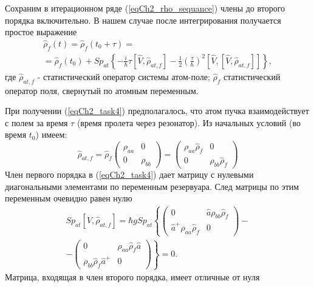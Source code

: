 Сохраним в итерационном ряде (\ref{eqCh2_rho_sequance}) члены до
второго порядка включительно. В нашем случае после интегрирования
получается простое выражение  
\begin{eqnarray}
\hat{\rho}_{f}\left(t\right) =
\hat{\rho}_{f}\left(t_0 + \tau\right) = 
\nonumber \\
= \hat{\rho}_{f}\left(t_0\right) +
Sp_{at}
\left\{
- \frac{i}{\hbar}\tau\left[\hat{V}, \hat{\rho}_{at, f}\right]
- \frac{1}{2} \left(\frac{\tau}{\hbar}\right)^2
\left[\hat{V},\left[\hat{V}, \hat{\rho}_{at, f}
\right]\right]
\right\}, 
\label{eqCh2_task4}
\end{eqnarray}
где $\hat{\rho}_{at, f}$ -  статистический оператор системы атом-поле;
$\hat{\rho}_{f}$ статистический оператор поля, свернутый по
атомным переменным.
  
При получении (\ref{eqCh2_task4}) предполагалось, что атом пучка
взаимодействует с полем за время $\tau$ (время пролета через
резонатор). Из начальных условий (во время $t_0$) имеем:  
\begin{equation}
\hat{\rho}_{at, f} = \hat{\rho}_{f}
\left(
\begin{array} {cc}
\rho_{aa} & 0  
\\
0 & \rho_{bb} 
\end{array}
\right) = 
\left(
\begin{array} {cc}
\rho_{aa}\hat{\rho}_{f} & 0  
\\
0 & \rho_{bb}\hat{\rho}_{f}
\end{array}
\right)
\end{equation}
Член первого порядка в (\ref{eqCh2_task4}) дает матрицу с нулевыми
диагональными элементами по переменным резервуара. След матрицы по
этим переменным очевидно равен нулю  
\begin{eqnarray}
Sp_{at}\left[\hat{V}, \hat{\rho}_{at, f}\right] = 
\hbar g Sp_{at}
\left\{
\left(
\begin{array} {cc}
0 & \hat{a} \rho_{bb}\hat{\rho}_{f}  
\\
\hat{a}^{+} \rho_{aa}\hat{\rho}_{f}   & 0
\end{array}
\right)
\right.
-
\nonumber \\
-
\left.
\left(
\begin{array} {cc}
0 & \rho_{aa} \hat{\rho}_{f} \hat{a}   
\\
\rho_{bb} \hat{\rho}_{f} \hat{a}^{+}   & 0
\end{array}
\right)
\right\}
= 0.
\label{eqCh2_sp_1}
\end{eqnarray}
Матрица, входящая в член второго порядка, имеет отличные от нуля
